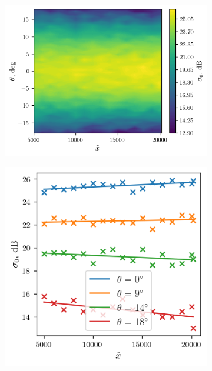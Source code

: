 \documentclass{article}
\begin{document}
\begin{figure}[t]
    \centering
    \begin{subfigure}{\linewidth}
        \centering
        \includegraphics[width=0.8\linewidth]{figs/fetch.png}
        \caption{}
        \label{scap:crosssec_slices:1}
    \end{subfigure}
    \begin{subfigure}{\linewidth}
        \centering
        \includegraphics[width=0.6\linewidth]{figs/fetch_slices.png}
        \caption{}
        \label{scap:crosssec_slices:2}
    \end{subfigure}


\end{figure}
\end{document}
